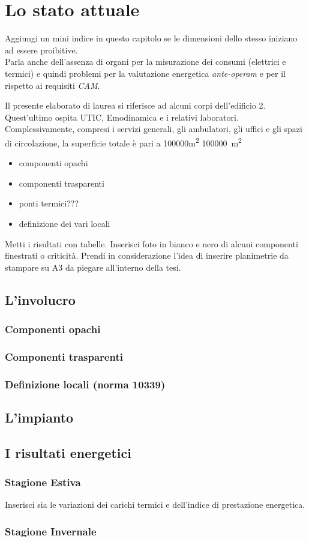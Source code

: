 \chapter{Lo stato attuale}
\thispagestyle{empty}

Aggiungi un mini indice in questo capitolo se le dimensioni dello stesso iniziano ad essere proibitive.\\
Parla anche dell'assenza di organi per la misurazione dei consumi (elettrici e termici) e quindi problemi per la valutazione energetica \emph{ante-operam} e per il rispetto ai requisiti \emph{CAM}.\vspace{1em}

Il presente elaborato di laurea si riferisce ad alcuni corpi dell'edificio 2. Quest'ultimo ospita UTIC, Emodinamica e i relativi laboratori. Complessivamente, compresi i servizi generali, gli ambulatori, gli uffici e gli spazi di circolazione, la superficie totale è pari a \num{100000}\si{m^2} \SI{100000}{m^2} 
\begin{itemize}
	\item componenti opachi
	\item componenti trasparenti
	\item ponti termici???
	\item definizione dei vari locali
\end{itemize}
Metti i risultati con tabelle. 
Inserisci foto in bianco e nero di alcuni componenti finestrati o criticità.
Prendi in considerazione l'idea di inserire planimetrie da stampare su A3 da piegare all'interno della tesi. 
\section{L'involucro}
\subsection{Componenti opachi}
\subsection{Componenti trasparenti}
\subsection{Definizione locali (norma 10339)}
\section{L'impianto}
\section{I risultati energetici}
\subsection{Stagione Estiva}
Inserisci sia le variazioni dei carichi termici e dell'indice di prestazione energetica.
\subsection{Stagione Invernale}
